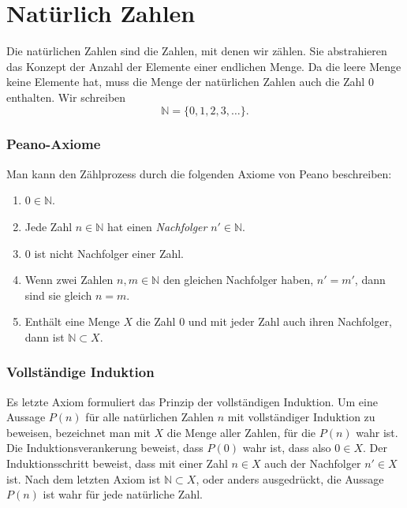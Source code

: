%
%
%
\section{Natürlich Zahlen
\label{buch:section:natuerliche-zahlen}}
Die natürlichen Zahlen sind die Zahlen, mit denen wir zählen.
%
%
Sie abstrahieren das Konzept der Anzahl der Elemente einer endlichen
Menge.
Da die leere Menge keine Elemente hat, muss die Menge der natürlichen
Zahlen auch die Zahl $0$ enthalten.
Wir schreiben
\[
\mathbb{N}
=
\{
0,1,2,3,\dots
\}.
\]

\subsubsection{Peano-Axiome}
Man kann den Zählprozess durch die folgenden Axiome von Peano beschreiben:
%
\begin{enumerate}
\item $0\in\mathbb N$.
\item Jede Zahl $n\in \mathbb{N}$ hat einen {\em Nachfolger}
$n'\in \mathbb{N}$.
%
\item $0$ ist nicht Nachfolger einer Zahl.
\item Wenn zwei Zahlen $n,m\in\mathbb{N}$ den gleichen Nachfolger haben,
$n'=m'$, dann sind sie gleich $n=m$.
\item Enthält eine Menge $X$ die Zahl $0$ und mit jeder Zahl auch ihren
Nachfolger, dann ist $\mathbb{N}\subset X$.
\end{enumerate}

\subsubsection{Vollständige Induktion}
Es letzte Axiom formuliert das Prinzip der vollständigen Induktion.
Um eine Aussage $P(n)$ für alle natürlichen Zahlen $n$
mit vollständiger Induktion zu beweisen, bezeichnet man mit
$X$ die Menge aller Zahlen, für die $P(n)$ wahr ist.
Die Induktionsverankerung beweist, dass $P(0)$ wahr ist, dass also $0\in X$.
Der Induktionsschritt beweist, dass mit einer Zahl $n\in X$ auch der
Nachfolger $n'\in X$ ist.
Nach dem letzten Axiom ist $\mathbb{N}\subset X$, oder anders ausgedrückt,
die Aussage $P(n)$ ist wahr für jede natürliche Zahl.

